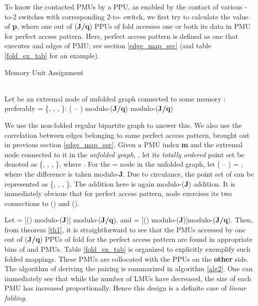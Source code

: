 \documentclass[12pt]{article}
\begin{document}
To know the contacted PMUs by a PPU, as
enabled by the contact of various -to-2 switches with corresponding
2-to- switch, we first try to
calculate the value of \textbf{p}, where
 one out of (\textbf{J/q}) PPUs of  fold
accesses one or both its data in  PMU for 
perfect access pattern. Here,  perfect access pattern is defined as one
that executes  and 
edges of  PMU; see section
\ref{edge_map_sec} (and table \ref{fold_ex_tab} for an example).

\begin{algorithm}[!h]
\caption{Memory Unit Assignment}
\label{alg2}
\begin{algorithmic}[0]
        \\\Comment Let  be an extremal node of unfolded graph
        connected to some memory : preferably  = 
        \State   \{, , , \}:       
        \State    ( -- )
           modulo-(\textbf{J/q})
           modulo-(\textbf{J/q})
        \EndFor
    \EndFor
\EndFor
\end{algorithmic}
\end{algorithm}

We use the non-folded regular bipartite graph to answer this. We also use
the correlation between edges belonging to same perfect access pattern, brought
out in previous section \ref{edge_map_sec}. Given a PMU
index \textbf{m} and the extremal node connected to it in the
\textit{unfolded graph}, , let its \textit{totally ordered}
point set be denoted as \{, , , \}, where       . For the  = {\large } node in the
unfolded graph, let ( -- ) = , where the difference is taken
modulo-\textbf{J}. Due to circulance, the point set of  can be
represented as \{, , , \}. The addition here is again modulo-(\textbf{J})
addition. It is immediately obvious that for  perfect access
pattern, node  exercises its two connections to
() and ().

Let  = [() modulo-(\textbf{J})]
modulo-(\textbf{J/q}), and  =
[() modulo-(\textbf{J})]modulo-(\textbf{J/q}). Then, from theorem \ref{th1}, it
is straightforward to see that the PMUs accessed by
 one out of (\textbf{J/q}) PPUs of
 fold for the  perfect access pattern are
found in appropriate bins of  and  PMUs.
Table \ref{fold_ex_tab} is organized to explicitly exemplify such
folded mappings.
These PMUs are collocated with the PPUs on the
\textbf{other} side. The algorithm of deriving the pairing is summarized in
algorithm \ref{alg2}.
One can immediately see that while the number of LMUs have
decreased, the size of each PMU has increased proportionally. Hence
this design is a definite case of \textit{linear folding}.
\end{document}
